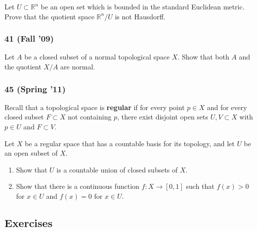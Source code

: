 \begin{problem}[?]

Let \(U \subset {\mathbb{R}}^n\) be an open set which is bounded in the
standard Euclidean metric. Prove that the quotient space
\({\mathbb{R}}^n / U\) is not Hausdorff.

\end{problem}

\hypertarget{fall-09}{%
\subsubsection{41 (Fall '09)}\label{fall-09}}

\begin{problem}[?]

Let \(A\) be a closed subset of a normal topological space \(X\). Show
that both \(A\) and the quotient \(X/A\) are normal.

\end{problem}

\hypertarget{spring-11-1}{%
\subsubsection{45 (Spring '11)}\label{spring-11-1}}

\begin{problem}[?]

Recall that a topological space is \textbf{regular} if for every point
\(p \in X\) and for every closed subset \(F \subset X\) not containing
\(p\), there exist disjoint open sets \(U, V \subset X\) with
\(p \in U\) and \(F \subset V\).

Let \(X\) be a regular space that has a countable basis for its
topology, and let \(U\) be an open subset of \(X\).

\begin{enumerate}
\def\labelenumi{\alph{enumi}.}
\item
  Show that \(U\) is a countable union of closed subsets of \(X\).
\item
  Show that there is a continuous function \(f : X \to [0,1]\) such that
  \(f (x) > 0\) for \(x \in U\) and \(f (x) = 0\) for \(x \in U\).
\end{enumerate}

\end{problem}

\hypertarget{exercises}{%
\subsection{Exercises}\label{exercises}}

